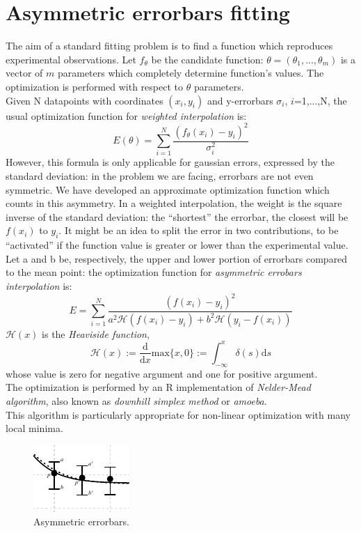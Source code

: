 \section{Asymmetric errorbars fitting}\label{Appendix B}
The aim of a standard fitting problem is to find a function which
reproduces experimental observations.
Let $f_{\theta}$ be the candidate function:
$\theta=(\theta_1,...,\theta_m)$ is a vector of $m$ parameters which
completely determine function's values.
The optimization is performed with respect to $\theta$ parameters.\\
Given N datapoints with coordinates ${(x_i,y_i)}$ and y-errorbars
$\sigma_i$, $i$=1,...,N, the usual optimization function for
\textit{weighted interpolation}\cite{interpolation} is:
$$
E(\theta)= \sum_{i=1}^{N} \frac{(f_{\theta}(x_i)-y_i)^2}{\sigma_{i}^2}
$$
However, this formula is only applicable for gaussian errors,
expressed by the standard deviation: in the problem we are facing,
errorbars are not even symmetric.
We have developed an approximate optimization function which counts
in this asymmetry.
In a weighted interpolation, the weight is the square inverse of the
standard deviation: the ``shortest'' the errorbar, the closest will
be $f(x_i)$ to $y_i$.
It might be an idea to split the error in two contributions,
to be ``activated'' if the function value is greater or lower
than the experimental value.
Let a and b be, respectively, the upper and lower portion of errorbars
compared to the mean point:
the optimization function for \textit{asymmetric
  errobars interpolation} is:
$$ E= \sum_{i=1}^{N} \frac{(f(x_i)-y_i)^2}{a^{2}\mathcal{H}(f(x_i)-y_i)+b^{2}\mathcal{H}(y_i-f(x_i))} $$
$\mathcal{H}(x)$ is the \textit{Heaviside function},
$$\mathcal{H}(x):=\frac{\mathrm{d}}{\mathrm{d}x}\mathrm{max}
\{x,0\}:=\int_{-\infty}^x \delta (s) \mathrm{d}s$$ whose value
is zero for negative argument and one for positive argument.\\
The optimization is performed by an R implementation\cite{Roptim}
of \textit{Nelder-Mead algorithm},\cite{neldermeadoriginal}
also known as \textit{downhill simplex method} or
\textit{amoeba}.\cite{neldermeadnumrec}\\
This algorithm is particularly appropriate for non-linear
optimization with many local minima.
\begin{figure}[h!]
  \centering
  \includegraphics[width=.4\columnwidth]{img/err.pdf}
  \caption{Asymmetric errorbars.}
  \label{fig:errors}
\end{figure}
